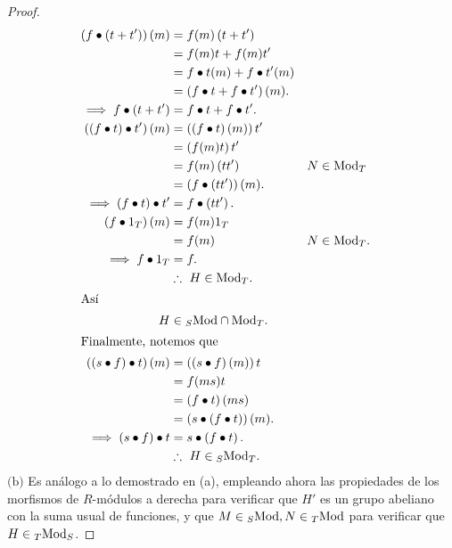 \documentclass{article}
\begin{document}
\begin{enumerate}[label=\textbf{Ej \arabic*.}]
\begin{proof}
\begin{align*}
				\lrprth{f\bullet\lrprth{t+t'}}(m)&=f(m)\lrprth{t+t'}\\
				&=f(m)t+f(m)t'\\
				&=f\bullet t(m)+ f\bullet t' (m)\\
				&=\lrprth{f\bullet t+ f\bullet t' }(m).\\
				\implies f\bullet\lrprth{t+t'}&= f\bullet t+ f\bullet t'.\\
				\lrprth{\lrprth{f\bullet t}\bullet t'}(m)&=\lrprth{\lrprth{f\bullet t}(m)}t'\\
				&=\lrprth{f(m)t}t'\\
				&=f(m)\lrprth{tt'} && N\in\ringmod{T}{\text{Mod}}{r}\\
				&=\lrprth{f\bullet\lrprth{tt'}}(m).\\
				\implies \lrprth{f\bullet t}\bullet t'&= f\bullet\lrprth{tt'}.\\
				\lrprth{f\bullet 1_T}(m)&=f(m)1_T\\
				&=f(m) && N\in\ringmod{T}{\text{Mod}}{r}.\\
				\implies f\bullet 1_T&= f.\\
				&\therefore\ H\in\ringmod{T}{\text{Mod}}{r}.\\
				\intertext{Así}
				H&\in\ringmod{S}{\text{Mod}}{l}\cap \ringmod{T}{\text{Mod}}{r}.\\
				\intertext{Finalmente, notemos que}
				\lrprth{\lrprth{s\bullet f}\bullet t}(m)&=\lrprth{\lrprth{s\bullet f}(m)}t\\
				&=f(ms)t\\
				&=\lrprth{f\bullet t}(ms)\\
				&=\lrprth{s\bullet\lrprth{f\bullet t}}(m).\\
				\implies \lrprth{s\bullet f}\bullet t&= s\bullet\lrprth{f\bullet t}.\\
				&\therefore\ H\in\ringbimod{S}{T}{\text{Mod}}{lr}.
			\end{align*} 
			$\boxed{\text{(b)}}$ Es análogo a lo demostrado en (a), empleando ahora las propiedades de los morfismos de $R$-módulos a derecha para verificar que $H'$ es un grupo abeliano con la suma usual de funciones, y que $M\in\ringmod{S}{\text{Mod}}{l}, N\in\ringmod{T}{\text{Mod}}{l}$ para verificar que $H\in\ringbimod{T}{S}{\text{Mod}}{lr}$.
		\end{proof}
		

\end{enumerate}
\end{document}
